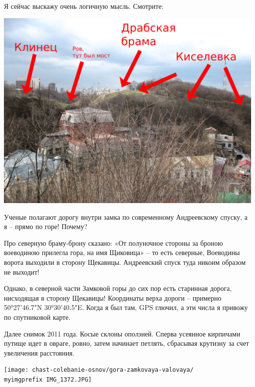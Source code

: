 Я сейчас выскажу очень логичную мысль. Смотрите:

\begin{center}
\includegraphics[width=\linewidth]{chast-colebanie-osnov/gora-zamkovaya-valovaya/zamok-scheme.jpg}
\end{center}


Ученые полагают дорогу внутри замка по современному Андреевскому спуску, а я – прямо по горе! Почему?

Про северную браму-брону сказано: «От полуночное стороны за броною воеводиною прилегла гора, на имя Щиковица» – то есть северные, Воеводины ворота выходили в сторону Щекавицы. Андреевский спуск туда никоим образом не выходит!

Однако, в северной части Замковой горы до сих пор есть старинная дорога, нисходящая в сторону Щекавицы! Координаты верха дороги – примерно 50°27'46.7"N 30°30'40.5"E. Когда я был там, GPS глючил, а эти числа я привожу по спутниковой карте.

Далее снимок 2011 года. Косые склоны оползней. Сперва усеянное кирпичами путище идет в овраге, ровно, затем начинает петлять, сбрасывая крутизну за счет увеличения расстояния.

\begin{center}
\texttt{[image: chast-colebanie-osnov/gora-zamkovaya-valovaya/\\myimgprefix IMG\_1372.JPG]}
\end{center}

